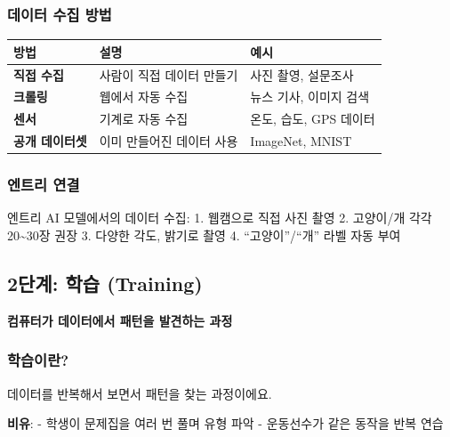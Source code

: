 \documentclass[a4paper, 11pt]{article}
\renewenvironment{quote}
  {\begin{tcolorbox}[colback=lightblue!30, colframe=mainblue!50,
   left=8pt, right=8pt, top=4pt, bottom=4pt, breakable]}
  {\end{tcolorbox}}
\begin{document}
\hypertarget{uxb370uxc774uxd130-uxc218uxc9d1-uxbc29uxbc95}{%
\subsubsection{데이터 수집
방법}\label{uxb370uxc774uxd130-uxc218uxc9d1-uxbc29uxbc95}}

\begin{longtable}{p{3cm}p{4cm}p{7cm}}
\toprule\noalign{}
방법 & 설명 & 예시 \\
\midrule\noalign{}
\endhead
\bottomrule\noalign{}
\endlastfoot
\textbf{직접 수집} & 사람이 직접 데이터 만들기 & 사진 촬영, 설문조사 \\
\textbf{크롤링} & 웹에서 자동 수집 & 뉴스 기사, 이미지 검색 \\
\textbf{센서} & 기계로 자동 수집 & 온도, 습도, GPS 데이터 \\
\textbf{공개 데이터셋} & 이미 만들어진 데이터 사용 & ImageNet, MNIST \\
\end{longtable}

\hypertarget{uxc5d4uxd2b8uxb9ac-uxc5f0uxacb0}{%
\subsubsection{엔트리 연결}\label{uxc5d4uxd2b8uxb9ac-uxc5f0uxacb0}}

엔트리 AI 모델에서의 데이터 수집: 1. 웹캠으로 직접 사진 촬영 2.
고양이/개 각각 20\textasciitilde30장 권장 3. 다양한 각도, 밝기로 촬영 4.
``고양이''/``개'' 라벨 자동 부여

\hypertarget{uxb2e8uxacc4-uxd559uxc2b5-training}{%
\subsection{2단계: 학습
(Training)}\label{uxb2e8uxacc4-uxd559uxc2b5-training}}

\begin{quote}
\textbf{컴퓨터가 데이터에서 패턴을 발견하는 과정}
\end{quote}

\hypertarget{uxd559uxc2b5uxc774uxb780}{%
\subsubsection{학습이란?}\label{uxd559uxc2b5uxc774uxb780}}

데이터를 반복해서 보면서 패턴을 찾는 과정이에요.

\textbf{비유}: - 학생이 문제집을 여러 번 풀며 유형 파악 - 운동선수가
같은 동작을 반복 연습
\end{document}

